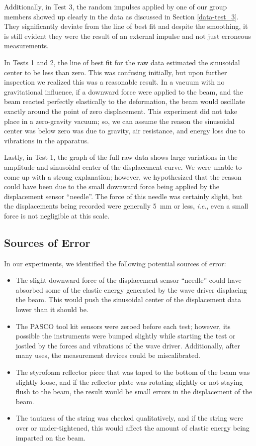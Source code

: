 \documentclass[12 pt]{report}
\newcommand{\ie}{\textit{i}.\textit{e}., }
\begin{document}
Additionally, in Test \num{3}, the random impulses applied by one of our group members showed up clearly in the data as discussed in Section \ref{data-test_3}. They significantly deviate from the line of best fit and despite the smoothing, it is still evident they were the result of an external impulse and not just erroneous measurements.

In Tests \num{1} and \num{2}, the line of best fit for the raw data estimated the sinusoidal center to be less than zero. This was confusing initially, but upon further inspection we realized this was a reasonable result. In a vacuum with no gravitational influence, if a downward force were applied to the beam, and the beam reacted perfectly elastically to the deformation, the beam would oscillate exactly around the point of zero displacement. This experiment did not take place in a zero-gravity vacuum; so, we can assume the reason the sinusoidal center was below zero was due to gravity, air resistance, and energy loss due to vibrations in the apparatus.

Lastly, in Test \num{1}, the graph of the full raw data shows large variations in the amplitude and sinusoidal center of the displacement curve. We were unable to come up with a strong explanation; however, we hypothesized that the reason could have been due to the small downward force being applied by the displacement sensor ``needle''. The force of this needle was certainly slight, but the displacements being recorded were generally \qty{5}{\mm} or less, \ie even a small force is not negligible at this scale.

\subsection{Sources of Error} \label{analysis-sources_of_error}
In our experiments, we identified the following potential sources of error:

\begin{itemize}
	\item The slight downward force of the displacement sensor ``needle'' could have absorbed some of the elastic energy generated by the wave driver displacing the beam. This would push the sinusoidal center of the displacement data lower than it should be.
	\item The PASCO tool kit sensors were zeroed before each test; however, its possible the instruments were bumped slightly while starting the test or jostled by the forces and vibrations of the wave driver. Additionally, after many uses, the measurement devices could be miscalibrated.
	\item The styrofoam reflector piece that was taped to the bottom of the beam was slightly loose, and if the reflector plate was rotating slightly or not staying flush to the beam, the result would be small errors in the displacement of the beam.
	\item The tautness of the string was checked qualitatively, and if the string were over or under-tightened, this would affect the amount of elastic energy being imparted on the beam.
\end{itemize}
\end{document}
